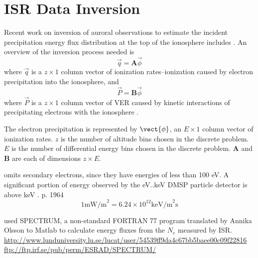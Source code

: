 \section{ISR Data Inversion}\label{sec:isrinv}
Recent work on inversion of auroral observations to estimate the incident precipitation energy flux distribution at the top of the ionosphere includes \citet{zett2007,semeter2012,dahlgren2013,wedlund2013,hirsch2016}. 
An overview of the inversion process needed is
\begin{equation}\label{eq:fiefk1}
\vec{q} = \mathbf{A}\vec{\phi}
\end{equation}
where $\vec{q}$ is a $z \times 1$ column vector of ionization rates--ionization caused by electron precipitation into the ionosphere, and
\begin{equation}\label{eq:fiefk2}
\vec{P} = \mathbf{B} \vec{\phi}
\end{equation}
where $\vec{P}$ is a $z \times 1$ column vector of VER caused by kinetic interactions of precipitating electrons with the ionosphere \citep{wedlund2013}.

The electron precipitation is represented by $\vect{\phi}$, an $E \times 1$ column vector of ionization rates. 
$z$ is the number of altitude bins chosen in the discrete problem. 
$E$ is the number of differential energy bins chosen in the discrete problem. 
$\mathbf{A}$ and $\mathbf{B}$ are each of dimensions $z \times E$.





\citet{partamies2004} omits secondary electrons, since they have energies of less than 100 eV. %
A significant portion of energy observed by the \unit[32]{eV}..\unit[30]{keV} DMSP particle detector is above \unit[8]{keV} \citep{partamies2004}. %
p. 1964 $$ 1\textrm{mW/m}^2 = 6.24\times10^{12} \textrm{keV/m}^2\textrm{s} $$

\citet{partamies2004} used SPECTRUM, a non-standard FORTRAN 77 program translated by Annika Olsson to Matlab to calculate energy fluxes from the $N_e$ measured by ISR.
\url{http://www.lunduniversity.lu.se/lucat/user/54539ff9da4c67bb5baee00c09f22816}
\url{ftp://ftp.irf.se/pub/perm/ESRAD/SPECTRUM/}